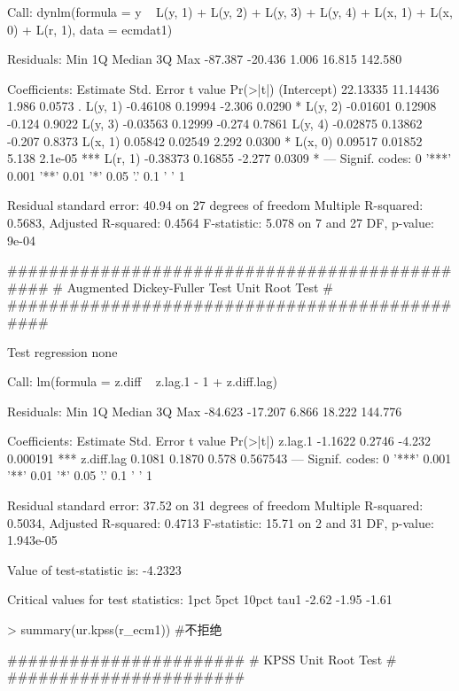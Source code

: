 \documentclass{article}
\begin{document}
\begin{Schunk}
\begin{Soutput}
Call:
dynlm(formula = y ~ L(y, 1) + L(y, 2) + L(y, 3) + L(y, 4) + L(x, 
    1) + L(x, 0) + L(r, 1), data = ecmdat1)

Residuals:
    Min      1Q  Median      3Q     Max 
-87.387 -20.436   1.006  16.815 142.580 

Coefficients:
            Estimate Std. Error t value Pr(>|t|)    
(Intercept) 22.13335   11.14436   1.986   0.0573 .  
L(y, 1)     -0.46108    0.19994  -2.306   0.0290 *  
L(y, 2)     -0.01601    0.12908  -0.124   0.9022    
L(y, 3)     -0.03563    0.12999  -0.274   0.7861    
L(y, 4)     -0.02875    0.13862  -0.207   0.8373    
L(x, 1)      0.05842    0.02549   2.292   0.0300 *  
L(x, 0)      0.09517    0.01852   5.138  2.1e-05 ***
L(r, 1)     -0.38373    0.16855  -2.277   0.0309 *  
---
Signif. codes:  0 '***' 0.001 '**' 0.01 '*' 0.05 '.' 0.1 ' ' 1

Residual standard error: 40.94 on 27 degrees of freedom
Multiple R-squared:  0.5683,	Adjusted R-squared:  0.4564 
F-statistic: 5.078 on 7 and 27 DF,  p-value: 9e-04
\end{Soutput}
\begin{Soutput}
############################################### 
# Augmented Dickey-Fuller Test Unit Root Test # 
############################################### 

Test regression none 


Call:
lm(formula = z.diff ~ z.lag.1 - 1 + z.diff.lag)

Residuals:
    Min      1Q  Median      3Q     Max 
-84.623 -17.207   6.866  18.222 144.776 

Coefficients:
           Estimate Std. Error t value Pr(>|t|)    
z.lag.1     -1.1622     0.2746  -4.232 0.000191 ***
z.diff.lag   0.1081     0.1870   0.578 0.567543    
---
Signif. codes:  0 '***' 0.001 '**' 0.01 '*' 0.05 '.' 0.1 ' ' 1

Residual standard error: 37.52 on 31 degrees of freedom
Multiple R-squared:  0.5034,	Adjusted R-squared:  0.4713 
F-statistic: 15.71 on 2 and 31 DF,  p-value: 1.943e-05


Value of test-statistic is: -4.2323 

Critical values for test statistics: 
      1pct  5pct 10pct
tau1 -2.62 -1.95 -1.61
\end{Soutput}
\begin{Sinput}
> summary(ur.kpss(r_ecm1)) #不拒绝
\end{Sinput}
\begin{Soutput}
####################### 
# KPSS Unit Root Test # 
####################### 


\end{Soutput}
\end{Schunk}
\end{document}
